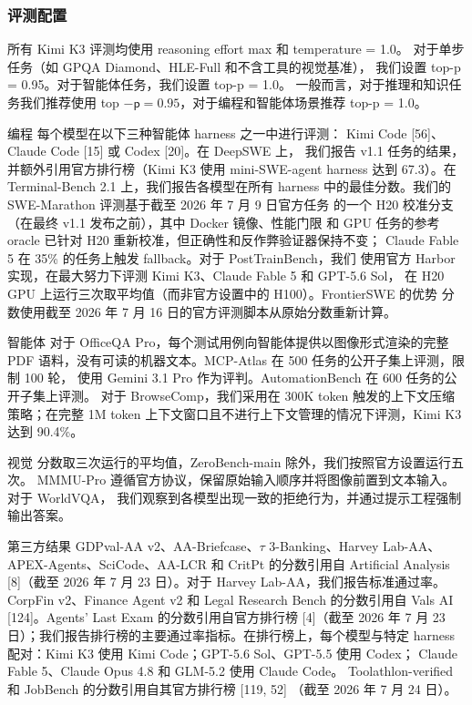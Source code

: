 \documentclass[
  10
]{article}
\begin{document}
\subsubsection{评测配置}\label{evaluation-configurations}

所有 Kimi K3 评测均使用 reasoning effort max 和 temperature = 1.0。
对于单步任务（如 GPQA Diamond、HLE-Full 和不含工具的视觉基准），
我们设置 top-p = 0.95。对于智能体任务，我们设置 top-p = 1.0。
一般而言，对于推理和知识任务我们推荐使用 top
\(- \mathsf { p } = 0 . 9 5\)，对于编程和智能体场景推荐 top-p = 1.0。

编程 每个模型在以下三种智能体 harness 之一中进行评测：
Kimi Code {[}56{]}、Claude Code {[}15{]} 或 Codex {[}20{]}。在 DeepSWE 上，
我们报告 v1.1 任务的结果，并额外引用官方排行榜（Kimi K3 使用 mini-SWE-agent
harness 达到 67.3）。在 Terminal-Bench 2.1 上，我们报告各模型在所有 harness
中的最佳分数。我们的 SWE-Marathon 评测基于截至 2026 年 7 月 9 日官方任务
的一个 H20 校准分支（在最终 v1.1 发布之前），其中 Docker 镜像、性能门限
和 GPU 任务的参考 oracle 已针对 H20 重新校准，但正确性和反作弊验证器保持不变；
Claude Fable 5 在 35\% 的任务上触发 fallback。对于 PostTrainBench，我们
使用官方 Harbor 实现，在最大努力下评测 Kimi K3、Claude Fable 5 和 GPT-5.6 Sol，
在 H20 GPU 上运行三次取平均值（而非官方设置中的 H100）。FrontierSWE 的优势
分数使用截至 2026 年 7 月 16 日的官方评测脚本从原始分数重新计算。

智能体 对于 OfficeQA Pro，每个测试用例向智能体提供以图像形式渲染的完整 PDF
语料，没有可读的机器文本。MCP-Atlas 在 500 任务的公开子集上评测，限制 100 轮，
使用 Gemini 3.1 Pro 作为评判。AutomationBench 在 600 任务的公开子集上评测。
对于 BrowseComp，我们采用在 300K token 触发的上下文压缩策略；在完整 1M token
上下文窗口且不进行上下文管理的情况下评测，Kimi K3 达到 90.4\%。

视觉 分数取三次运行的平均值，ZeroBench-main 除外，我们按照官方设置运行五次。
MMMU-Pro 遵循官方协议，保留原始输入顺序并将图像前置到文本输入。对于 WorldVQA，
我们观察到各模型出现一致的拒绝行为，并通过提示工程强制输出答案。

第三方结果 GDPval-AA v2、AA-Briefcase、$\tau$ 3-Banking、Harvey Lab-AA、
APEX-Agents、SciCode、AA-LCR 和 CritPt 的分数引用自 Artificial Analysis
{[}8{]}（截至 2026 年 7 月 23 日）。对于 Harvey Lab-AA，我们报告标准通过率。
CorpFin v2、Finance Agent v2 和 Legal Research Bench 的分数引用自 Vals AI
{[}124{]}。Agents' Last Exam 的分数引用自官方排行榜 {[}4{]}（截至 2026 年
7 月 23 日）；我们报告排行榜的主要通过率指标。在排行榜上，每个模型与特定
harness 配对：Kimi K3 使用 Kimi Code；GPT-5.6 Sol、GPT-5.5 使用 Codex；
Claude Fable 5、Claude Opus 4.8 和 GLM-5.2 使用 Claude Code。
Toolathlon-verified 和 JobBench 的分数引用自其官方排行榜 {[}119, 52{]}
（截至 2026 年 7 月 24 日）。
\end{document}
